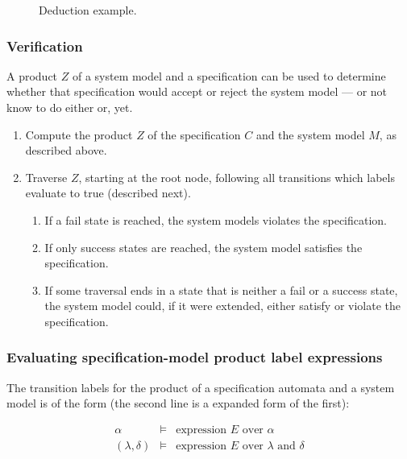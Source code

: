 \documentclass[a4paper,11pt]{kth-mag}
\begin{document}
\begin{figure}[h!]
  \caption{Deduction example.}
	\label{figure-deduction-example}
\end{figure}


\subsubsection{Verification}

A product $Z$ of a system model and a specification can be used to determine
whether that specification would accept or reject the system model --- or not
know to do either or, yet.

\begin{enumerate}
  \item Compute the product $Z$ of the specification $C$ and the system model
    $M$, as described above.

  \item Traverse $Z$, starting at the root node, following all transitions
    which labels evaluate to true (described next).

    \begin{enumerate}
      \item If a fail state is reached, the system models violates the
        specification.
      \item If only success states are reached, the system model satisfies the
        specification.
      \item If some traversal ends in a state that is neither a fail or a
        success state, the system model could, if it were extended, either
        satisfy or violate the specification.
    \end{enumerate}
\end{enumerate}


\subsubsection{Evaluating specification-model product label expressions}

The transition labels for the product of a specification automata and a system
model is of the form (the second line is a expanded form of the first):

\medskip
\[
  \begin{array}{rcl}
    \alpha & \models & \text{expression $E$ over $\alpha$} \\
    (\lambda, \delta) & \models & \text{expression $E$ over $\lambda$ and $\delta$}
  \end{array}
\]
\medskip
\end{document}
